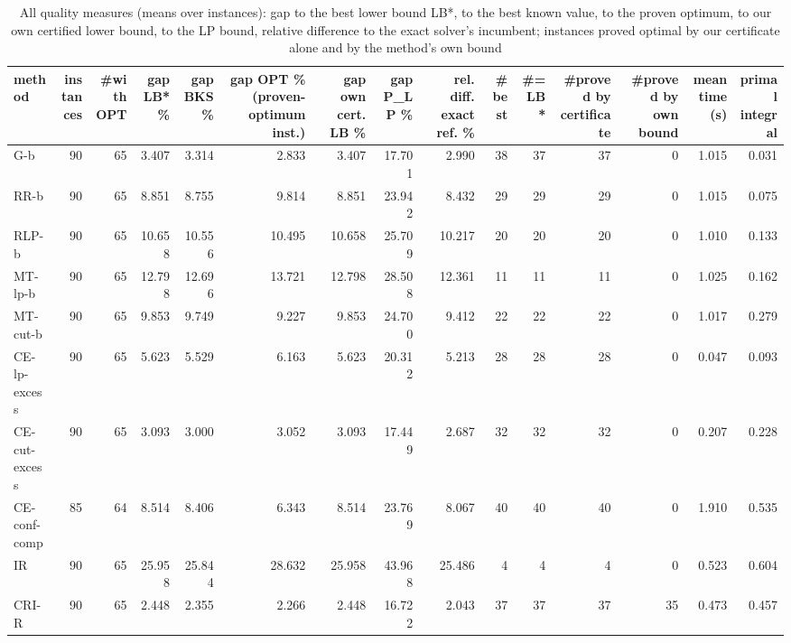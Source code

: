 \begin{table}[htbp]
\centering
\small
\caption{All quality measures (means over instances): gap to the best lower bound LB*, to the best known value, to the proven optimum, to our own certified lower bound, to the LP bound, relative difference to the exact solver's incumbent; instances proved optimal by our certificate alone and by the method's own bound}
\label{tab:E2b_head_to_head_budgets_b1_all_metrics}
\begin{tabular}{lrrrrrrrrrrrrrr}
\toprule
method & instances & \#with OPT & gap LB* \% & gap BKS \% & gap OPT \% (proven-optimum inst.) & gap own cert. LB \% & gap P\_LP \% & rel. diff. exact ref. \% & \#best & \#= LB* & \#proved by certificate & \#proved by own bound & mean time (s) & primal integral \\
\midrule
G-b & 90 & 65 & 3.407 & 3.314 & 2.833 & 3.407 & 17.701 & 2.990 & 38 & 37 & 37 & 0 & 1.015 & 0.031 \\
RR-b & 90 & 65 & 8.851 & 8.755 & 9.814 & 8.851 & 23.942 & 8.432 & 29 & 29 & 29 & 0 & 1.015 & 0.075 \\
RLP-b & 90 & 65 & 10.658 & 10.556 & 10.495 & 10.658 & 25.709 & 10.217 & 20 & 20 & 20 & 0 & 1.010 & 0.133 \\
MT-lp-b & 90 & 65 & 12.798 & 12.696 & 13.721 & 12.798 & 28.508 & 12.361 & 11 & 11 & 11 & 0 & 1.025 & 0.162 \\
MT-cut-b & 90 & 65 & 9.853 & 9.749 & 9.227 & 9.853 & 24.700 & 9.412 & 22 & 22 & 22 & 0 & 1.017 & 0.279 \\
CE-lp-excess & 90 & 65 & 5.623 & 5.529 & 6.163 & 5.623 & 20.312 & 5.213 & 28 & 28 & 28 & 0 & 0.047 & 0.093 \\
CE-cut-excess & 90 & 65 & 3.093 & 3.000 & 3.052 & 3.093 & 17.449 & 2.687 & 32 & 32 & 32 & 0 & 0.207 & 0.228 \\
CE-conf-comp & 85 & 64 & 8.514 & 8.406 & 6.343 & 8.514 & 23.769 & 8.067 & 40 & 40 & 40 & 0 & 1.910 & 0.535 \\
IR & 90 & 65 & 25.958 & 25.844 & 28.632 & 25.958 & 43.968 & 25.486 & 4 & 4 & 4 & 0 & 0.523 & 0.604 \\
CRI-R & 90 & 65 & 2.448 & 2.355 & 2.266 & 2.448 & 16.722 & 2.043 & 37 & 37 & 37 & 35 & 0.473 & 0.457 \\
\bottomrule
\end{tabular}
\end{table}
